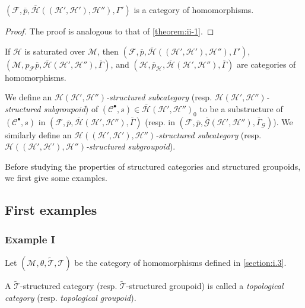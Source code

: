 \documentclass[a4paper,fleqn]{article}
\theoremstyle{plain}
\newenvironment{theorem}[1]
  {\renewcommand\theinnertheorem{#1}\innertheorem}
  {\endinnertheorem}
\theoremstyle{definition}
\newenvironment{definition}[1]
  {\renewcommand\theinnerdefinition{#1}\innerdefinition}
  {\endinnerdefinition}
\newcommand{\oldpage}[1]{{\marginpar{\footnotesize$\bigg\vert$\,\,\,\,\textit{p.~#1}}}}
\newcommand{\CC}{\mathcal{C}}
\newcommand{\HH}{\mathcal{H}}
\newcommand{\bHH}{\overline{\HH}}
\newcommand{\MM}{\mathcal{M}}
\newcommand{\FF}{\mathcal{F}}
\newcommand{\TT}{\mathcal{T}}
\newcommand{\tTT}{\widetilde{\TT}}
\newcommand{\GG}{\mathcal{G}}
\newcommand{\smallbullet}{\bullet}
\begin{document}
\oldpage{386}

\begin{theorem}{2}
\label{theorem:ii-2}
  $(\FF,\overline{p},\bHH((\HH',\HH'),\HH''),\Gamma')$ is a category of homomorphisms.
\end{theorem}

\begin{proof}
  The proof is analogous to that of \cref{theorem:ii-1}.
\end{proof}

\begin{theorem}{3}
\label{theorem:ii-3}
  If $\HH$ is saturated over $\MM$, then $(\FF,\overline{p},\bHH((\HH',\HH'),\HH''),\Gamma')$, $(\MM,p_\FF\overline{p},\bHH(\HH',\HH''),\overline{\Gamma})$, and $(\HH,\overline{p}_\HH,\bHH(\HH',\HH''),\overline{\Gamma})$ are categories of homomorphisms.
\end{theorem}

\begin{definition}{6}
\label{definition:ii-6}
  We define an \emph{$\HH(\HH',\HH'')$-structured subcategory} (resp. \emph{$\HH(\HH',\HH'')$-structured subgroupoid}) of $(\CC^\smallbullet,s)\in\bHH(\HH',\HH'')_0$ to be a substructure of $(\CC^\smallbullet,s)$ in $(\FF,\overline{p},\bHH(\HH',\HH''),\overline{\Gamma})$ (resp. in $(\FF,\overline{p},\overline{\GG}(\HH',\HH''),\overline{\Gamma}_\GG)$).
  We similarly define an \emph{$\HH((\HH',\HH'),\HH'')$-structured subcategory} (resp. \emph{$\HH((\HH',\HH'),\HH'')$-structured subgroupoid}).
\end{definition}

Before studying the properties of structured categories and structured groupoids, we first give some examples.


\subsection{First examples}
\label{section:ii.3}

\subsubsection*{Example I}
\label{section:ii.3.i}

Let $(\MM,\theta,\tTT,\TT)$ be the category of homomorphisms defined in \cref{section:i.3}.

\begin{definition}{7}
\label{definition:ii-7}
  A $\tTT$-structured category (resp. $\tTT$-structured groupoid) is called a \emph{topological category} (resp. \emph{topological groupoid}).
\end{definition}
\end{document}
